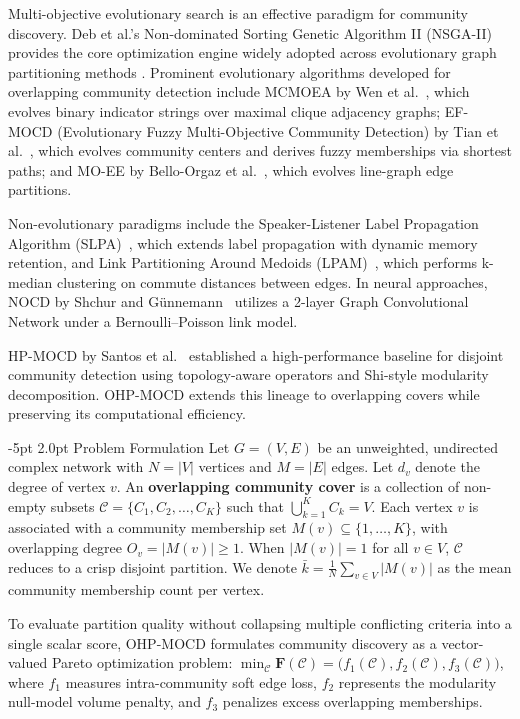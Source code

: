 \documentclass{svproc}
\makeatletter
\renewcommand\section{\@startsection{section}{1}{\z@}%
  {-5pt \@plus -1pt \@minus -0.5pt}%
  {2.0pt \@plus 0.5pt}%
  {\normalfont\large\bfseries\boldmath}}
\makeatother
\begin{document}
Multi-objective evolutionary search is an effective paradigm for community discovery. Deb et al.'s Non-dominated Sorting Genetic Algorithm II (NSGA-II)~\cite{deb2002} provides the core optimization engine widely adopted across evolutionary graph partitioning methods \cite{pizzuti2012}. Prominent evolutionary algorithms developed for overlapping community detection include MCMOEA by Wen et al.~\cite{wen2016}, which evolves binary indicator strings over maximal clique adjacency graphs; EF-MOCD (Evolutionary Fuzzy Multi-Objective Community Detection) by Tian et al.~\cite{tian2020}, which evolves community centers and derives fuzzy memberships via shortest paths; and MO-EE by Bello-Orgaz et al.~\cite{bello2018}, which evolves line-graph edge partitions.

Non-evolutionary paradigms include the Speaker-Listener Label Propagation Algorithm (SLPA)~\cite{xie2012}, which extends label propagation with dynamic memory retention, and Link Partitioning Around Medoids (LPAM)~\cite{ponomarenko2021}, which performs k-median clustering on commute distances between edges. In neural approaches, NOCD by Shchur and G{\"u}nnemann~\cite{shchur2019} utilizes a 2-layer Graph Convolutional Network under a Bernoulli--Poisson link model.

HP-MOCD by Santos et al.~\cite{santos2025} established a high-performance baseline for disjoint community detection using topology-aware operators and Shi-style modularity decomposition. OHP-MOCD extends this lineage to overlapping covers while preserving its computational efficiency.

\section{Problem Formulation}\label{sec:problem}
Let $G = (V, E)$ be an unweighted, undirected complex network with $N = |V|$ vertices and $M = |E|$ edges. Let $d_v$ denote the degree of vertex $v$. An \textbf{overlapping community cover} is a collection of non-empty subsets $\mathcal{C} = \{C_1, C_2, \dots, C_K\}$ such that $\bigcup_{k=1}^K C_k = V$. Each vertex $v$ is associated with a community membership set $M(v) \subseteq \{1, \dots, K\}$, with overlapping degree $O_v = |M(v)| \ge 1$. When $|M(v)| = 1$ for all $v \in V$, $\mathcal{C}$ reduces to a crisp disjoint partition. We denote $\bar{k} = \frac{1}{N}\sum_{v \in V} |M(v)|$ as the mean community membership count per vertex.

To evaluate partition quality without collapsing multiple conflicting criteria into a single scalar score, OHP-MOCD formulates community discovery as a vector-valued Pareto optimization problem: $\min_{\mathcal{C}} \mathbf{F}(\mathcal{C}) = \big( f_1(\mathcal{C}), f_2(\mathcal{C}), f_3(\mathcal{C}) \Big)$, where $f_1$ measures intra-community soft edge loss, $f_2$ represents the modularity null-model volume penalty, and $f_3$ penalizes excess overlapping memberships.
\end{document}
